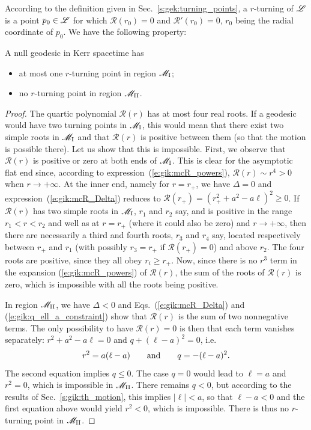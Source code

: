 According to the definition given in Sec.~\ref{s:gek:turning_points},
a $r$-turning of $\mathscr{L}$ is a point $p_0\in \mathscr{L}$ for which $\mathcal{R}(r_0) = 0$
and $\mathcal{R}'(r_0) = 0$, $r_0$ being the radial coordinate of $p_0$.
We have the following property:
\begin{greybox}
A null geodesic in Kerr spacetime has
\begin{itemize}
\item at most one $r$-turning point in region $\mathscr{M}_{\rm I}$;
\item no $r$-turning point in region $\mathscr{M}_{\rm II}$.
\end{itemize}
\end{greybox}
\begin{proof}
The quartic polynomial $\mathcal{R}(r)$ has at most four real roots. If
a geodesic would have two turning points in $\mathscr{M}_{\rm I}$, this would mean
that there exist two simple roots in $\mathscr{M}_{\rm I}$ and that
$\mathcal{R}(r)$ is positive between them (so that the motion is possible
there). Let us show that this is impossible.
First, we observe that $\mathcal{R}(r)$ is positive or zero at both
ends of $\mathscr{M}_{\rm I}$. This is clear
for the asymptotic flat end since, according to expression~(\ref{e:gik:mcR_powers}),
$\mathcal{R}(r) \sim r^4 > 0$ when $r\to +\infty$. At the inner end,
namely for $r = r_+$,
we have $\Delta = 0$ and expression~(\ref{e:gik:mcR_Delta}) reduces to
$\mathcal{R}(r_+) = (r_+^2 + a^2 - a \ell)^2 \geq 0$.
If $\mathcal{R}(r)$ has two simple roots in $\mathscr{M}_{\rm I}$, $r_1$ and $r_2$ say, and is
positive in the range $r_1< r < r_2$ and well as at $r=r_+$ (where it could also be zero)
and $r\to+\infty$, then there
are necessarily a third and fourth roots, $r_3$ and $r_4$ say,
located respectively between $r_+$ and $r_1$ (with possibly $r_3 = r_+$ if $\mathcal{R}(r_+)= 0$)
and above $r_2$.
The four roots are positive, since they all obey $r_i \geq r_+$. Now,
since there is no $r^3$ term in the expansion (\ref{e:gik:mcR_powers}) of $\mathcal{R}(r)$,
the sum of the roots of $\mathcal{R}(r)$ is zero, which is impossible with all
the roots being positive.

In region $\mathscr{M}_{\rm II}$, we have $\Delta < 0$ and
Eqs.~(\ref{e:gik:mcR_Delta}) and (\ref{e:gik:q_ell_a_constraint}) show that
$\mathcal{R}(r)$ is the sum of two nonnegative terms. The only possibility
to have $\mathcal{R}(r)=0$ is then that each term vanishes separately:
$r^2 + a^2 - a\ell = 0$ and $q + (\ell -a)^2 = 0$, i.e.
\[
  r^2 = a (\ell - a) \qquad\mbox{and}\qquad q = - (\ell - a)^2 .
\]
The second equation implies $q\leq 0$. The case $q=0$ would lead to $\ell = a$ and $r^2 = 0$,
which is impossible in $\mathscr{M}_{\rm II}$. There remains $q < 0$, but
according to the results of Sec.~\ref{s:gik:th_motion}, this implies $|\ell| < a$, so
that $\ell - a < 0$ and the first equation above would yield $r^2 < 0$, which is impossible.
There is thus no $r$-turning point in $\mathscr{M}_{\rm II}$.
\end{proof}

